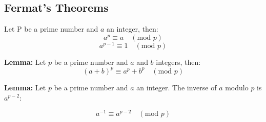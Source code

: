 \subsection{Fermat's Theorems}
Let P be a prime number and $a$ an integer, then:
$$a^p \equiv a \quad (\text{mod } p)$$
$$a^{p-1} \equiv 1 \quad (\text{mod } p)$$

\textbf{Lemma:} Let $p$ be a prime number and $a$ and $b$ integers, then: 
$$(a+b)^{p} \equiv a^{p} + b^{p} \quad (\text{mod } p)$$

\textbf{Lemma:} Let $p$ be a prime number and $a$ an integer. The inverse of $a$ modulo $p$ is $a^{p-2}$:

$$a^{-1} \equiv a^{p-2} \quad (\text{mod } p)$$